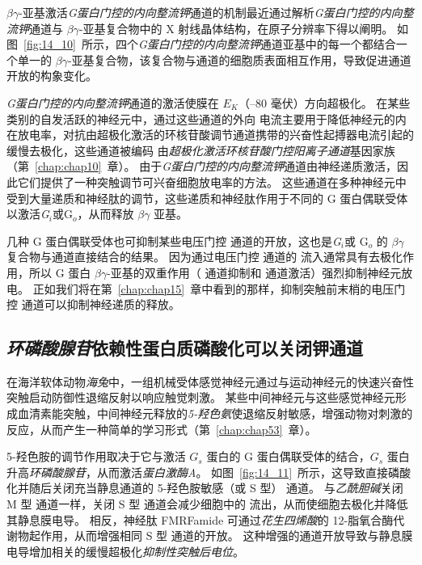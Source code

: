 $\beta \gamma$-亚基激活\textit{G蛋白门控的内向整流钾}通道的机制最近通过解析\textit{G蛋白门控的内向整流钾}通道与 $\beta \gamma$-亚基复合物中的 X 射线晶体结构，在原子分辨率下得以阐明。
如图~\ref{fig:14_10}~所示，四个\textit{G蛋白门控的内向整流钾}通道亚基中的每一个都结合一个单一的 $\beta \gamma$-亚基复合物，该复合物与通道的细胞质表面相互作用，导致促进通道开放的构象变化。


\textit{G蛋白门控的内向整流钾}通道的激活使膜在 $E_K$（–80 毫伏）方向超极化。
在某些类别的自发活跃的神经元中，通过这些通道的外向  电流主要用于降低神经元的内在放电率，对抗由超极化激活的环核苷酸调节通道携带的兴奋性起搏器电流引起的缓慢去极化，这些通道被编码 由\textit{超极化激活环核苷酸门控阳离子通道}基因家族（第~\ref{chap:chap10}~章）。
由于\textit{G蛋白门控的内向整流钾}通道由神经递质激活，因此它们提供了一种突触调节可兴奋细胞放电率的方法。
这些通道在多种神经元中受到大量递质和神经肽的调节，这些递质和神经肽作用于不同的 G 蛋白偶联受体以激活\textit{G$_i $}或G$_o$，从而释放 $\beta \gamma$ 亚基。


几种 G 蛋白偶联受体也可抑制某些电压门控  通道的开放，这也是\textit{G$_i $}或 G$_o$ 的 $\beta \gamma$ 复合物与通道直接结合的结果。
因为通过电压门控  通道的  流入通常具有去极化作用，所以 G 蛋白 $\beta \gamma$-亚基的双重作用（ 通道抑制和  通道激活）强烈抑制神经元放电。
正如我们将在第~\ref{chap:chap15}~章中看到的那样，抑制突触前末梢的电压门控  通道可以抑制神经递质的释放。



\subsection{\textit{环磷酸腺苷}依赖性蛋白质磷酸化可以关闭钾通道}

在海洋软体动物\textit{海兔}中，一组机械受体感觉神经元通过与运动神经元的快速兴奋性突触启动防御性退缩反射以响应触觉刺激。
某些中间神经元与这些感觉神经元形成血清素能突触，中间神经元释放的\textit{5-羟色氨}使退缩反射敏感，增强动物对刺激的反应，从而产生一种简单的学习形式（第~\ref{chap:chap53}~章）。


5-羟色胺的调节作用取决于它与激活 $ G_s $ 蛋白的 G 蛋白偶联受体的结合，$ G_s $ 蛋白升高\textit{环磷酸腺苷}，从而激活\textit{蛋白激酶A}。
如图~\ref{fig:14_11}~所示，这导致直接磷酸化并随后关闭充当静息通道的 5-羟色胺敏感（或 S 型） 通道。
与\textit{乙酰胆碱}关闭 M 型  通道一样，关闭 S 型  通道会减少细胞中的  流出，从而使细胞去极化并降低其静息膜电导。
相反，神经肽 FMRFamide 可通过\textit{花生四烯酸}的 12-脂氧合酶代谢物起作用，从而增强相同 S 型  通道的开放。
这种增强的通道开放导致与静息膜电导增加相关的缓慢超极化\textit{抑制性突触后电位}。


